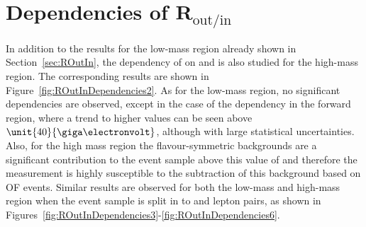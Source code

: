 \chapter{Dependencies of $\mathbf{R}_{\text{out/in}}$}
In addition to the results for the low-mass region already shown in Section~\ref{sec:ROutIn}, the dependency of \Routin on \MET and \njets is also studied for the high-mass region. The corresponding results are shown in Figure~\ref{fig:ROutInDependencies2}. As for the low-mass region, no significant dependencies are observed, except in the case of the \MET dependency in the forward region, where a trend to higher values can be seen above $\unit{40}{\giga\electronvolt}$, although with large statistical uncertainties. Also, for the high mass region the flavour-symmetric backgrounds are a significant contribution to the event sample above this value of \MET and therefore the measurement is highly susceptible to the subtraction of this background based on OF events. Similar results are observed for both the low-mass and high-mass region when the event sample is split in to \EE and \MM lepton pairs, as shown in Figures~\ref{fig:ROutInDependencies3}-\ref{fig:ROutInDependencies6}.
\label{app:routin}
